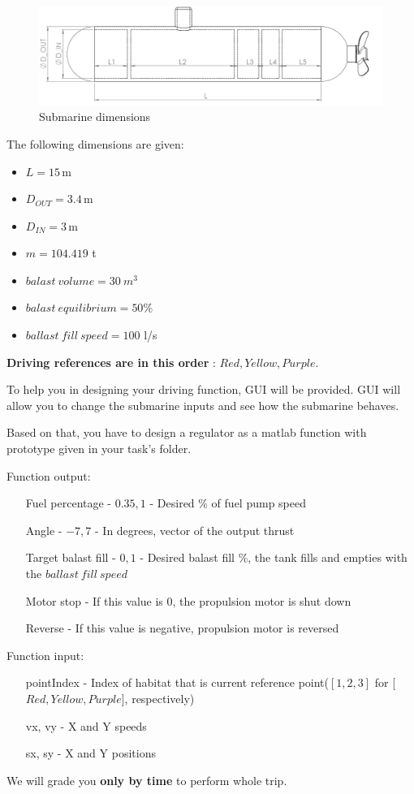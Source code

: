 \documentclass{article}
\begin{document}
\begin{figure}[h!]
	\centering
	\includegraphics[width=\textwidth]{submarine_side_view.png}
	\caption{Submarine dimensions}
	\label{fig:side_view}
\end{figure}

The following dimensions are given:
\begin{itemize}
	\item $L = 15 \,\textrm{m}$
	\item $D_{OUT} = 3.4 \,\textrm{m}$
	\item $D_{IN} = 3 \,\textrm{m}$
	\item $m = 104.419$ t
	\item $balast\ volume = 30 \ m^3$
	\item $balast\ equilibrium = 50\%$
	\item $ballast\ fill\ speed = 100$ l/s
\end{itemize}


\textbf{Driving references are in this order} : $Red, Yellow, Purple$.


To help you in designing your driving function, GUI will be provided. GUI will allow you to change the submarine inputs and see how the submarine behaves.
 
Based on that, you have to design a regulator as a matlab function with prototype given in your task's folder.

Function output:

\begin{itemize}
	\item[Fuel percentage] - ${0.35,1}$ - Desired \% of fuel pump speed
	\item[Angle] - ${-7,7}$ - In degrees, vector of the output thrust
	\item[Target balast fill] - ${0,1}$ - Desired balast fill \%, the tank fills and empties with the $ballast\ fill\ speed$
	\item[Motor stop] - If this value is 0, the propulsion motor is shut down
	\item[Reverse] - If this value is negative, propulsion motor is reversed
\end{itemize}

Function input:

\begin{itemize}
	\item[pointIndex] - Index of habitat that is current reference point($[1, 2, 3]$ for [$Red, Yellow, Purple$], respectively)
	\item[vx, vy] - X and Y speeds
	\item[sx, sy] - X and Y positions
\end{itemize}


We will grade you \textbf{only by time} to perform whole trip.
\end{document}
